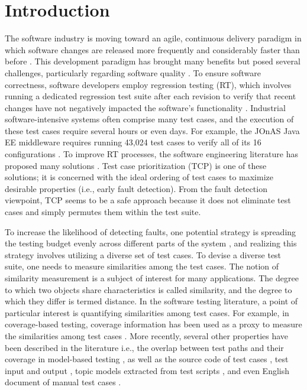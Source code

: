 \documentclass[runningheads]{llncs}
\begin{document}
\section{Introduction}

The software industry is moving toward an agile, continuous delivery paradigm in which software changes are released more frequently and considerably faster than before \cite{rodriguez2017continuous}. This development paradigm has brought many benefits but posed several challenges, particularly regarding software quality \cite{rodriguez2017continuous,mantyla2015rapid}. To ensure software correctness, software developers employ regression testing (RT), which involves running a dedicated regression test suite after each revision to verify that recent changes have not negatively impacted the software's functionality \cite{engstrom2010qualitative}. Industrial software-intensive systems often comprise many test cases, and the execution of these test cases require several hours or even days. For example, the JOnAS Java EE middleware requires running 43,024 test cases to verify all of its 16 configurations \cite{kessis2005experiences}. To improve RT processes, the software engineering literature has proposed many solutions \cite{yoo2012regression}. Test case prioritization (TCP) \cite{rothermel2001prioritizing} is one of these solutions; it is concerned with the ideal ordering of test cases to maximize desirable properties (i.e., early fault detection). From the fault detection viewpoint, TCP seems to be a safe approach because it does not eliminate test cases and simply permutes them within the test suite.

To increase the likelihood of detecting faults, one potential strategy is spreading the testing budget evenly across different parts of the system \cite{jiang2009adaptive,hemmati2010reducing,ledru2012prioritizing}, and realizing this strategy involves utilizing a diverse set of test cases. To devise a diverse test suite, one needs to measure similarities among the test cases. The notion of similarity measurement is a subject of interest for many applications. The degree to which two objects share characteristics is called similarity, and the degree to which they differ is termed distance. In the software testing literature, a point of particular interest is quantifying similarities among test cases. For example, in coverage-based testing, coverage information has been used as a proxy to measure the similarities among test cases \cite{jiang2009adaptive}. More recently, several other properties have been described in the literature i.e., the overlap between test paths and their coverage in model-based testing \cite{hemmati2011empirical,cartaxo2011use}, as well as the source code of test cases \cite{ledru2012prioritizing}, test input and output \cite{henard2016comparing}, topic models extracted from test scripts \cite{thomas2014static}, and even English document of manual test cases \cite{hemmati2017prioritizing}.
\end{document}
